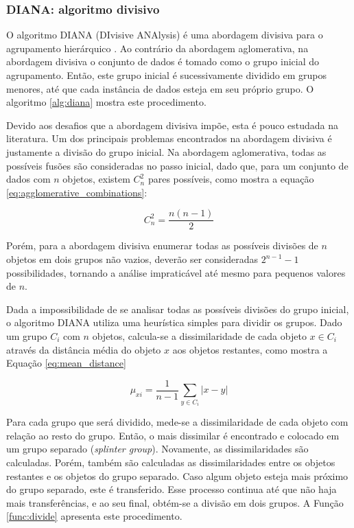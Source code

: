\subsubsection{DIANA: algoritmo divisivo}
	\label{subsec:diana}

O algoritmo DIANA (DIvisive ANAlysis) é uma abordagem divisiva para o
agrupamento hierárquico \cite{kaufman1990finding}. Ao contrário da abordagem
aglomerativa, na abordagem divisiva o conjunto de dados é tomado como o grupo
inicial do agrupamento. Então, este grupo inicial é sucessivamente dividido em
grupos menores, até que cada instância de dados esteja em seu próprio grupo.
O algoritmo \ref{alg:diana} mostra este procedimento.



Devido aos desafios que a abordagem divisiva impõe, esta é pouco estudada na
literatura. Um dos principais problemas encontrados na abordagem divisiva é
justamente a divisão do grupo inicial. Na abordagem aglomerativa, todas as
possíveis fusões são consideradas no passo inicial, dado que, para um conjunto
de dados com $n$ objetos, existem $C_{n}^{2}$ pares possíveis, como mostra a
equação \ref{eq:agglomerative_combinations}:

\begin{equation}
	C_n^2 = \frac{n \left(n-1\right)}{2}
	\label{eq:agglomerative_combinations}
\end{equation}

Porém, para a abordagem divisiva enumerar todas as possíveis divisões de $n$
objetos em dois grupos não vazios, deverão ser consideradas $2^{n-1} - 1$
possibilidades, tornando a análise impraticável até mesmo para pequenos valores
de $n$.

Dada a impossibilidade de se analisar todas as possíveis divisões do grupo
inicial, o algoritmo DIANA utiliza uma heurística simples para dividir os
grupos. Dado um grupo $C_i$ com $n$ objetos, calcula-se a dissimilaridade de
cada objeto $x \in C_i$ através da distância média do objeto $x$ aos objetos
restantes, como mostra a Equação \ref{eq:mean_distance}

\begin{equation}
	\mu_{xi} = \frac{1}{n-1} \sum_{y \in C_i }{\left| x - y \right|}
	\label{eq:mean_distance}
\end{equation}

Para cada grupo que será dividido, mede-se a dissimilaridade de cada
objeto com relação ao resto do grupo. Então, o mais dissimilar é encontrado
e colocado em um grupo separado (\emph{splinter group}). Novamente, as
dissimilaridades são calculadas. Porém, também são calculadas as
dissimilaridades entre os objetos restantes e os objetos do grupo separado. Caso
algum objeto esteja mais próximo do grupo separado, este é transferido. Esse
processo continua até que não haja mais transferências, e ao seu final, obtém-se
a divisão em dois grupos. A Função \ref{func:divide} apresenta este procedimento.


